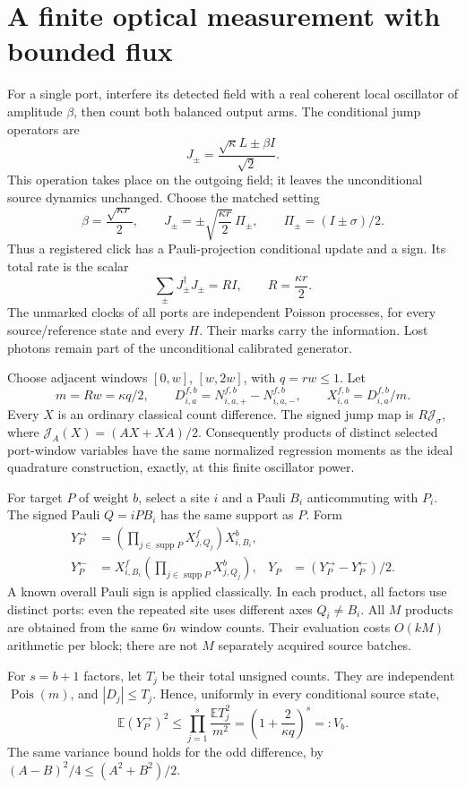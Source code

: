 \documentclass[11pt]{article}
\newcommand{\supp}{\operatorname{supp}}
\newcommand{\cJ}{\mathcal J}
\begin{document}
\section{A finite optical measurement with bounded flux}
For a single port, interfere its detected field with a real coherent local oscillator of amplitude \(\beta\), then count both balanced output arms. The conditional jump operators are
\[
 J_\pm=\frac{\sqrt\kappa L\pm\beta I}{\sqrt2}.
\]
This operation takes place on the outgoing field; it leaves the unconditional source dynamics unchanged. Choose the matched setting
\[
 \beta=\frac{\sqrt{\kappa r}}2,
 \qquad J_\pm=\pm\sqrt{\frac{\kappa r}{2}}\,\Pi_\pm,
 \qquad\Pi_\pm=(I\pm\sigma)/2.
\]
Thus a registered click has a Pauli-projection conditional update and a sign. Its total rate is the scalar
\[
 \sum_\pm J_\pm^\dagger J_\pm=RI,\qquad R=\frac{\kappa r}{2}.
\]
The unmarked clocks of all ports are independent Poisson processes, for every source/reference state and every \(H\). Their marks carry the information. Lost photons remain part of the unconditional calibrated generator.

Choose adjacent windows \([0,w]\), \([w,2w]\), with \(q=rw\le1\). Let
\[
 m=Rw=\kappa q/2,
 \qquad D_{i,a}^{f,b}=N_{i,a,+}^{f,b}-N_{i,a,-}^{f,b},
 \qquad X_{i,a}^{f,b}=D_{i,a}^{f,b}/m.
\]
Every \(X\) is an ordinary classical count difference. The signed jump map is \(R\cJ_\sigma\), where
\(\cJ_A(X)=(AX+XA)/2\). Consequently products of distinct selected port-window variables have the same normalized regression moments as the ideal quadrature construction, exactly, at this finite oscillator power.

For target \(P\) of weight \(b\), select a site \(i\) and a Pauli \(B_i\) anticommuting with \(P_i\). The signed Pauli \(Q=iPB_i\) has the same support as \(P\). Form
\begin{align*}
 Y_P^\to&=\left(\prod_{j\in\supp P}X_{j,Q_j}^{f}\right)X_{i,B_i}^{b},\\
 Y_P^\leftarrow&=X_{i,B_i}^{f}\left(\prod_{j\in\supp P}X_{j,Q_j}^{b}\right),
 &Y_P&=(Y_P^\to-Y_P^\leftarrow)/2.
\end{align*}
A known overall Pauli sign is applied classically. In each product, all factors use distinct ports: even the repeated site uses different axes \(Q_i\ne B_i\). All \(M\) products are obtained from the same \(6n\) window counts. Their evaluation costs \(O(kM)\) arithmetic per block; there are not \(M\) separately acquired source batches.

For \(s=b+1\) factors, let \(T_j\) be their total unsigned counts. They are independent \(\operatorname{Pois}(m)\), and \(|D_j|\le T_j\). Hence, uniformly in every conditional source state,
\[
 \mathbb E(Y_P^\to)^2\le
 \prod_{j=1}^s\frac{\mathbb E T_j^2}{m^2}
 =\left(1+\frac2{\kappa q}\right)^s=:V_b.
\]
The same variance bound holds for the odd difference, by
\((A-B)^2/4\le(A^2+B^2)/2\).
\end{document}
